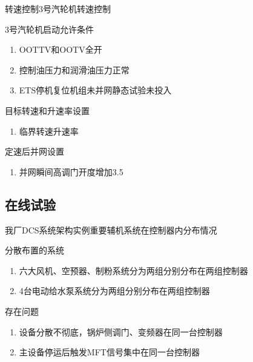 \documentclass[12pt,hyperref={CJKbookmarks=true}]{beamer} %
\begin{document}
\begin{frame}{转速控制}{3号汽轮机转速控制}
\begin{block}{\heiti 3号汽轮机启动允许条件}
			\begin{enumerate}
				\item OOTTV和OOTV全开
				\item 控制油压力和润滑油压力正常
				\item ETS停机复位机组未并网静态试验未投入
		\end{enumerate}
		\end{block}
\begin{block}{\heiti 目标转速和升速率设置}
			\begin{enumerate}
				\item 临界转速升速率
		\end{enumerate}
		\end{block}
\begin{block}{\heiti 定速后并网设置}
			\begin{enumerate}
				\item 并网瞬间高调门开度增加3.5
		\end{enumerate}
		\end{block}
\end{frame}
\subsection{在线试验}
\begin{frame}{我厂DCS系统架构实例}{重要辅机系统在控制器内分布情况}
\begin{block}{\heiti 分散布置的系统}
			\begin{enumerate}

				\item  六大风机、空预器、制粉系统分为两组分别分布在两组控制器
				
				\item   4台电动给水泵系统分为两组分别分布在两组控制器
		\end{enumerate}
		\end{block}
\pause
\begin{alertblock}{\heiti 存在问题}
			\begin{enumerate}
				\item  设备分散不彻底，锅炉侧调门、变频器在同一台控制器
				
				\item  主设备停运后触发MFT信号集中在同一台控制器
		\end{enumerate}
		\end{alertblock}
\end{frame}
\end{document}
